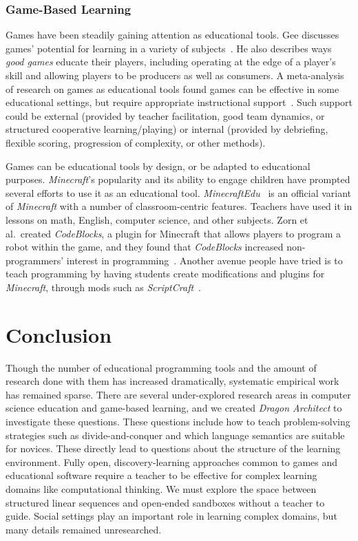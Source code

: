 \documentclass{sig-alternate}
\newcommand{\gametitle}{{\emph{Dragon Architect}}}
\begin{document}
\subsubsection{Game-Based Learning}
Games have been steadily gaining attention as educational tools. 
Gee discusses games' potential for learning in a variety of subjects~\cite{gee2003video}.
He also describes ways \emph{good games} educate their players, including operating at the edge of a player's skill and allowing players to be producers as well as consumers.
A meta-analysis of research on games as educational tools found games can be effective in some educational settings, but require appropriate instructional support~\cite{ke2009qualitative}.
Such support could be external (provided by teacher facilitation, good team dynamics, or structured cooperative learning/playing) or internal (provided by debriefing, flexible scoring, progression of complexity, or other methods).

Games can be educational tools by design, or be adapted to educational purposes. 
\emph{Minecraft}'s popularity and its ability to engage children have prompted several efforts to use it as an educational tool.
\emph{MinecraftEdu}~\cite{minecraftedu} is an official variant of \emph{Minecraft} with a number of classroom-centric features. 
Teachers have used it in lessons on math, English, computer science, and other subjects.  
Zorn et al.\ created \emph{CodeBlocks}, a plugin for Minecraft that allows players to program a robot within the game, and they found that \emph{CodeBlocks} increased non-programmers' interest in programming~\cite{zorn2013minecraft}.
Another avenue people have tried is to teach programming by having students create modifications and plugins for \emph{Minecraft}, through mods such as \emph{ScriptCraft}~\cite{scriptcraft}.

\section{Conclusion}

Though the number of educational programming tools and the amount of research done with them has increased dramatically, systematic empirical work has remained sparse.
There are several under-explored research areas in computer science education and game-based learning, and we created \gametitle{} to investigate these questions.
These questions include how to teach problem-solving strategies such as divide-and-conquer and which language semantics are suitable for novices.
These directly lead to questions about the structure of the learning environment.
Fully open, discovery-learning approaches common to games and educational software require a teacher to be effective for complex learning domains like computational thinking.
We must explore the space between structured linear sequences and open-ended sandboxes without a teacher to guide.
Social settings play an important role in learning complex domains, but many details remained unresearched.
\end{document}
